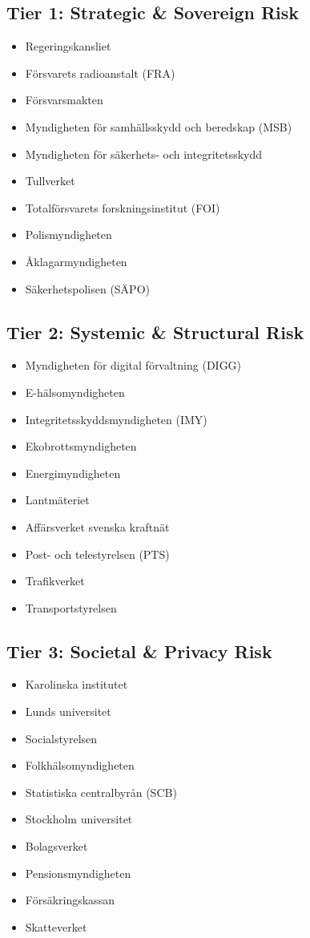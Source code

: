 \documentclass[conference]{IEEEtran}
\begin{document}
\subsection*{Tier 1: Strategic \& Sovereign Risk}
\begin{itemize}
    \item Regeringskansliet
    \item Försvarets radioanstalt (FRA)
    \item Försvarsmakten
    \item Myndigheten för samhällsskydd och beredskap (MSB)
    \item Myndigheten för säkerhets- och integritetsskydd
    \item Tullverket
    \item Totalförsvarets forskningsinstitut (FOI)
    \item Polismyndigheten
    \item Åklagarmyndigheten
    \item Säkerhetspolisen (SÄPO)
\end{itemize}

\subsection*{Tier 2: Systemic \& Structural Risk}
\begin{itemize}
    \item Myndigheten för digital förvaltning (DIGG)
    \item E-hälsomyndigheten
    \item Integritetsskyddsmyndigheten (IMY)
    \item Ekobrottsmyndigheten
    \item Energimyndigheten
    \item Lantmäteriet
    \item Affärsverket svenska kraftnät
    \item Post- och telestyrelsen (PTS)
    \item Trafikverket
    \item Transportstyrelsen
\end{itemize}

\subsection*{Tier 3: Societal \& Privacy Risk}
\begin{itemize}
    \item Karolinska institutet
    \item Lunds universitet
    \item Socialstyrelsen
    \item Folkhälsomyndigheten
    \item Statistiska centralbyrån (SCB)
    \item Stockholm universitet
    \item Bolagsverket
    \item Pensionsmyndigheten
    \item Försäkringskassan
    \item Skatteverket
\end{itemize}
\end{document}

